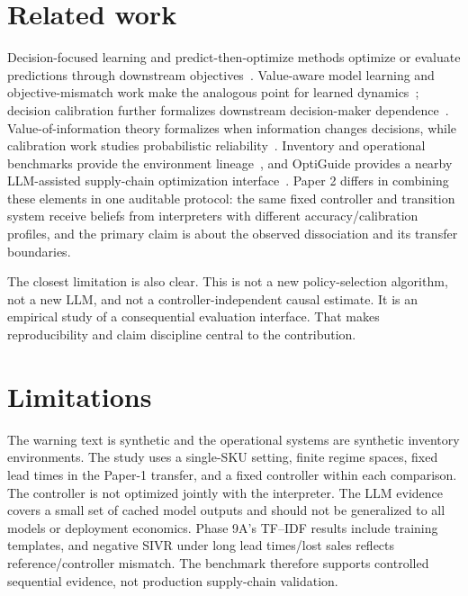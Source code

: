 \documentclass[10pt]{article}
\begin{document}
\section{Related work}

Decision-focused learning and predict-then-optimize methods optimize or evaluate predictions through downstream objectives~\citep{donti2017task,elmachtoub2022smart,mandi2022rank}. Value-aware model learning and objective-mismatch work make the analogous point for learned dynamics~\citep{farahmand2017value,lambert2020objective}; decision calibration further formalizes downstream decision-maker dependence~\citep{zhao2021decision}. Value-of-information theory formalizes when information changes decisions, while calibration work studies probabilistic reliability~\citep{guo2017calibration,degroot1983comparison}. Inventory and operational benchmarks provide the environment lineage~\citep{hubbs2020orgym}, and OptiGuide provides a nearby LLM-assisted supply-chain optimization interface~\citep{li2023optiguide}. Paper 2 differs in combining these elements in one auditable protocol: the same fixed controller and transition system receive beliefs from interpreters with different accuracy/calibration profiles, and the primary claim is about the observed dissociation and its transfer boundaries.

The closest limitation is also clear. This is not a new policy-selection algorithm, not a new LLM, and not a controller-independent causal estimate. It is an empirical study of a consequential evaluation interface. That makes reproducibility and claim discipline central to the contribution.

\section{Limitations}

The warning text is synthetic and the operational systems are synthetic inventory environments. The study uses a single-SKU setting, finite regime spaces, fixed lead times in the Paper-1 transfer, and a fixed controller within each comparison. The controller is not optimized jointly with the interpreter. The LLM evidence covers a small set of cached model outputs and should not be generalized to all models or deployment economics. Phase 9A's TF--IDF results include training templates, and negative SIVR under long lead times/lost sales reflects reference/controller mismatch. The benchmark therefore supports controlled sequential evidence, not production supply-chain validation.
\end{document}
